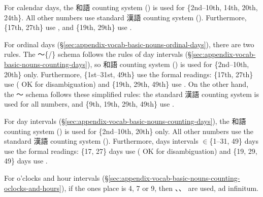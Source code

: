 \documentclass[../nihongo-gakushuu-kyouzai-supplementary.tex]{subfiles}
\begin{document}
\color{orange}
For calendar days, the 和語 counting system () is used for \{2nd--10th, 14th, 20th, 24th\}. All other numbers use standard 漢語 counting system (). Furthermore, \{17th, 27th\} use , and \{19th, 29th\} use .

For ordinal days (\S\ref{sec:appendix-vocab-basic-nouns-ordinal-days}), there are two rules. The 〜\{/\} schema follows the rules of day intervals (\S\ref{sec:appendix-vocab-basic-nouns-counting-days}), so 和語 counting system () is used for \{2nd--10th, 20th\} only. Furthermore, \{1st--31st, 49th\} use the formal readings: \{17th, 27th\} use  ( OK for disambiguation) and \{19th, 29th, 49th\} use . On the other hand, the 〜 schema follows these simplified rules: the standard 漢語 counting system is used for all numbers, and \{9th, 19th, 29th, 49th\} use .

For day intervals (\S\ref{sec:appendix-vocab-basic-nouns-counting-days}), the 和語 counting system () is used for \{2nd--10th, 20th\} only. All other numbers use the standard 漢語 counting system (). Furthermore, days intervals $\in$\{1--31, 49\} days use the formal readings: \{17, 27\} days use  ( OK for disambiguation) and \{19, 29, 49\} days use .

For o'clocks and hour intervals (\S\ref{sec:appendix-vocab-basic-nouns-counting-oclocks-and-hours}), if the ones place is 4, 7 or 9, then 、、 are used, ad infinitum.
\color{black}
\end{document}
